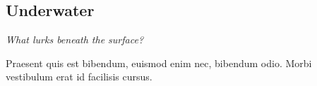 \subsection{Underwater}
\textit{What lurks beneath the surface?}

\begin{quotebox}
Praesent quis est bibendum, euismod enim nec, bibendum odio. Morbi vestibulum erat id facilisis cursus.
\end{quotebox}

